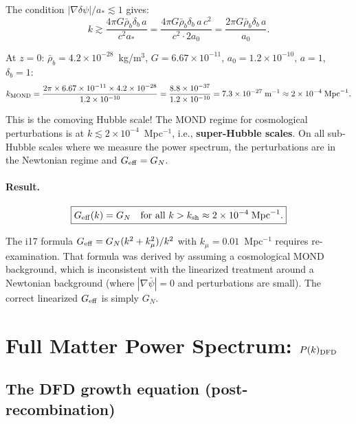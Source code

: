 \documentclass[aps,prd,twocolumn,nofootinbib]{revtex4-2}
\newcommand{\aM}{a_0}
\newcommand{\astar}{a_*}
\newcommand{\ee}[1]{\times 10^{#1}}
\newcommand{\dpsi}{\delta\psi}
\newcommand{\Geff}{G_{\rm eff}}
\newcommand{\kmu}{k_\mu}
\newcommand{\ksh}{k_{\rm sh}}
\begin{document}
The condition $|\nabla\dpsi|/\astar \lesssim 1$ gives:
\begin{equation}
k \gtrsim \frac{4\pi G\bar\rho_b\delta_b\,a}{c^2\astar}
= \frac{4\pi G\bar\rho_b\delta_b\,a\,c^2}{c^2\cdot 2\aM}
= \frac{2\pi G\bar\rho_b\delta_b\,a}{\aM}.
\end{equation}

At $z = 0$: $\bar\rho_b = 4.2\ee{-28}$~kg/m$^3$,
$G = 6.67\ee{-11}$, $\aM = 1.2\ee{-10}$, $a = 1$, $\delta_b = 1$:
\begin{equation}
k_{\rm MOND} = \frac{2\pi\times 6.67\ee{-11}\times 4.2\ee{-28}}{1.2\ee{-10}}
= \frac{8.8\ee{-37}}{1.2\ee{-10}}
= 7.3\ee{-27}\;\text{m}^{-1}
\approx 2\ee{-4}\;\text{Mpc}^{-1}.
\end{equation}

This is the comoving Hubble scale! The MOND regime for cosmological
perturbations is at $k \lesssim 2\ee{-4}$~Mpc$^{-1}$, i.e.,
\textbf{super-Hubble scales}. On all sub-Hubble scales where we
measure the power spectrum, the perturbations are in the Newtonian
regime and $\Geff = G_N$.

\paragraph{Result.}
\begin{equation}
\boxed{
\Geff(k) = G_N \quad \text{for all } k > \ksh
\approx 2\ee{-4}\;\text{Mpc}^{-1}.
}
\label{eq:Geff-result}
\end{equation}

The i17 formula $\Geff = G_N(k^2 + \kmu^2)/k^2$ with $\kmu
= 0.01$~Mpc$^{-1}$ requires re-examination. That formula was
derived by assuming a cosmological MOND background, which is
inconsistent with the linearized treatment around a Newtonian
background (where $|\nabla\bar\psi| = 0$ and perturbations are
small). The correct linearized $\Geff$ is simply $G_N$.


\section{Full Matter Power Spectrum: $P(k)_{\rm DFD}$}
\label{sec:Pk}

\subsection{The DFD growth equation (post-recombination)}
\end{document}
